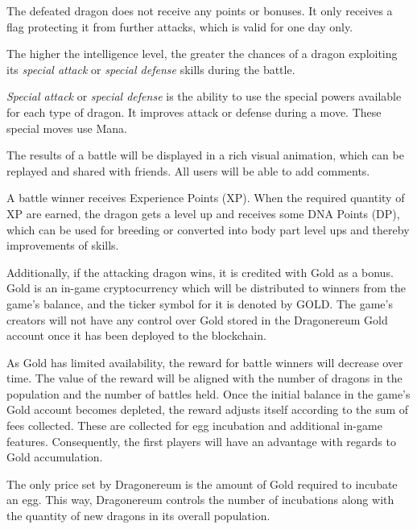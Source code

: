 \documentclass[12pt]{article}
\begin{document}
The defeated dragon does not receive any points or bonuses. It only receives a flag protecting it from further attacks, which is valid for one day only.\par

The higher the intelligence level, the greater the chances of a dragon exploiting its \textit{special attack} or \textit{special defense} skills during the battle.\par

\textit{Special attack} or \textit{special defense} is the ability to use the special powers available for each type of dragon. It improves attack or defense during a move. These special moves use Mana.\par

The results of a battle will be displayed in a rich visual animation, which can be replayed and shared with friends. All users will be able to add comments.\par

A battle winner receives Experience Points (XP). When the required quantity of XP are earned, the dragon gets a level up and receives some DNA Points (DP), which can be used for breeding or converted into body part level ups and thereby improvements of skills. \par

Additionally, if the attacking dragon wins, it is credited with Gold as a bonus. Gold is an in-game cryptocurrency which will be distributed to winners from the game’s balance, and the ticker symbol for it is denoted by GOLD. The game’s creators will not have any control over Gold stored in the Dragonereum Gold account once it has been deployed to the blockchain. \par

As Gold has limited availability, the reward for battle winners will decrease over time. The value of the reward will be aligned with the number of dragons in the population and the number of battles held. Once the initial balance in the game's Gold account becomes depleted, the reward adjusts itself according to the sum of fees collected. These are collected for egg incubation and additional in-game features. Consequently, the first players will have an advantage with regards to Gold accumulation.\par

The only price set by Dragonereum is the amount of Gold required to incubate an egg. This way, Dragonereum controls the number of incubations along with the quantity of new dragons in its overall population.\par
\end{document}
